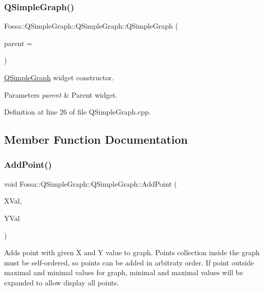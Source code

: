 \subsubsection{\texorpdfstring{Q\+Simple\+Graph()}{QSimpleGraph()}}
{\footnotesize\ttfamily Fossa\+::\+Q\+Simple\+Graph\+::\+Q\+Simple\+Graph\+::\+Q\+Simple\+Graph (\begin{DoxyParamCaption}\item[{Q\+Widget $\ast$}]{parent = {} }\end{DoxyParamCaption})}



\hyperlink{class_fossa_1_1_q_simple_graph_1_1_q_simple_graph}{Q\+Simple\+Graph} widget constructor. 


\begin{DoxyParams}{Parameters}
{\em parent} & Parent widget. \\
\hline
\end{DoxyParams}


Definition at line 26 of file Q\+Simple\+Graph.\+cpp.



\subsection{Member Function Documentation}
\mbox{\label{class_fossa_1_1_q_simple_graph_1_1_q_simple_graph_a39fdbd2aa624b7b086b5761308d8d49c}} 
\subsubsection{\texorpdfstring{Add\+Point()}{AddPoint()}}
{\footnotesize\ttfamily void Fossa\+::\+Q\+Simple\+Graph\+::\+Q\+Simple\+Graph\+::\+Add\+Point (\begin{DoxyParamCaption}\item[{double}]{X\+Val,  }\item[{double}]{Y\+Val }\end{DoxyParamCaption})\hspace{0.3cm}{\ttfamily [virtual]}}



Adds point with given X and Y value to graph. Points collection inside the graph must be self-\/ordered, so points can be added in arbitraty order. If point outside maximal and minimal values for graph, minimal and maximal values will be expanded to allow display all points. 


